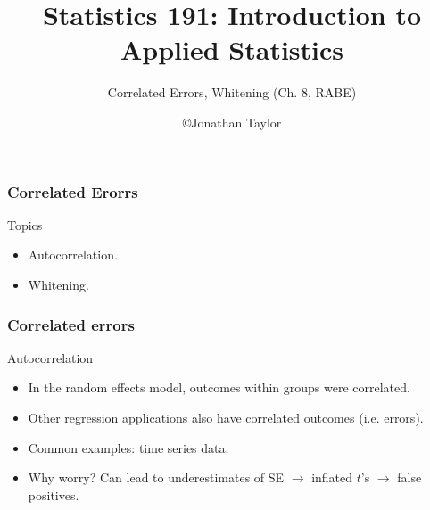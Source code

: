 \documentclass[handout]{beamer}
\title{Statistics 191: Introduction to Applied Statistics}
\subtitle{Correlated Errors, Whitening  (Ch. 8, RABE)}
\author{\copyright Jonathan Taylor \\
   }
\begin{document}
   \begin{frame}
   \titlepage
   \end{frame}


   \begin{frame} \frametitle{Correlated Erorrs}

   \begin{block}
   {Topics}
   \begin{itemize}

   \item Autocorrelation.


   \item Whitening.
   \end{itemize}
   \end{block}
   \end{frame}


   \begin{frame} \frametitle{Correlated errors}

   \begin{block}
   {Autocorrelation                     }

   \begin{itemize}

   \item In the random effects model, outcomes within groups
   were correlated.

   \item Other regression applications also have correlated outcomes (i.e. errors).

   \item Common examples: time series data.

   \item Why worry? Can lead to underestimates of SE $\rightarrow$ inflated $t$'s $\rightarrow$ false positives.

   \end{itemize}
   \end{block}
   \end{frame}

\end{document}
